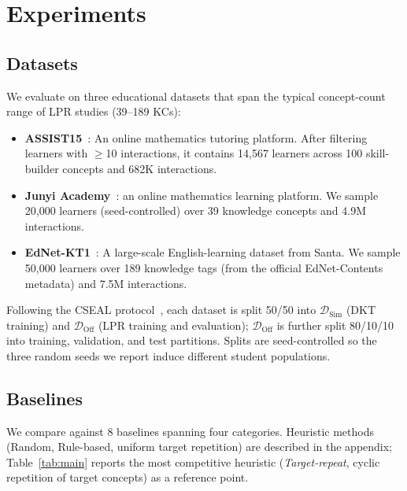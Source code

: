 \documentclass[sigconf,anonymous]{acmart}
\begin{document}
\section{Experiments}

\subsection{Datasets}

We evaluate on three educational datasets that span the typical concept-count range of LPR studies (39--189 KCs):

\begin{itemize}
    \item \textbf{ASSIST15}~\cite{feng2009assistments}: An online mathematics tutoring platform. After filtering learners with $\geq$10 interactions, it contains 14,567 learners across 100 skill-builder concepts and 682K interactions.
    \item \textbf{Junyi Academy}~\cite{chang2015junyi}: an online mathematics learning platform. We sample 20,000 learners (seed-controlled) over 39 knowledge concepts and 4.9M interactions.
    \item \textbf{EdNet-KT1}~\cite{choi2020ednet}: A large-scale English-learning dataset from Santa. We sample 50,000 learners over 189 knowledge tags (from the official EdNet-Contents metadata) and 7.5M interactions.
\end{itemize}

Following the CSEAL protocol~\cite{liu2019cseal}, each dataset is split 50/50 into $\mathcal{D}_{\text{Sim}}$ (DKT training) and $\mathcal{D}_{\text{Off}}$ (LPR training and evaluation); $\mathcal{D}_{\text{Off}}$ is further split 80/10/10 into training, validation, and test partitions. Splits are seed-controlled so the three random seeds we report induce different student populations.

\subsection{Baselines}

We compare against 8 baselines spanning four categories. Heuristic methods (Random, Rule-based, uniform target repetition) are described in the appendix; Table~\ref{tab:main} reports the most competitive heuristic (\textit{Target-repeat}, cyclic repetition of target concepts) as a reference point.
\end{document}
